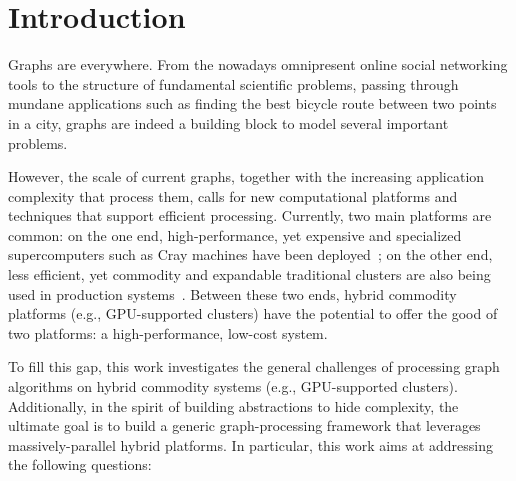 \section{Introduction}
\label{sec:intro}
Graphs are everywhere. From the nowadays omnipresent online social networking tools to the structure of fundamental scientific problems, passing through mundane applications such as finding the best bicycle route between two points in a city, graphs are indeed a building block to model several important problems.

However, the scale of current graphs, together with the increasing application complexity that process them, calls for new computational platforms and techniques that support efficient processing. Currently, two main platforms are common: on the one end, high-performance, yet expensive and specialized supercomputers such as Cray machines have been deployed~\cite{mizell2009early, yoo2005scalable}; on the other end, less efficient, yet commodity and expandable traditional clusters are also being used in production systems~\cite{Malewicz2009}. Between these two ends, hybrid commodity platforms (e.g., GPU-supported clusters) have the potential to offer the good of two platforms: a high-performance, low-cost system.

To fill this gap, this work investigates the general challenges of processing graph algorithms on hybrid commodity systems (e.g., GPU-supported clusters). Additionally, in the spirit of building abstractions to hide complexity, the ultimate goal is to build a generic graph-processing framework that leverages massively-parallel hybrid platforms. In particular, this work aims at addressing the following questions:

